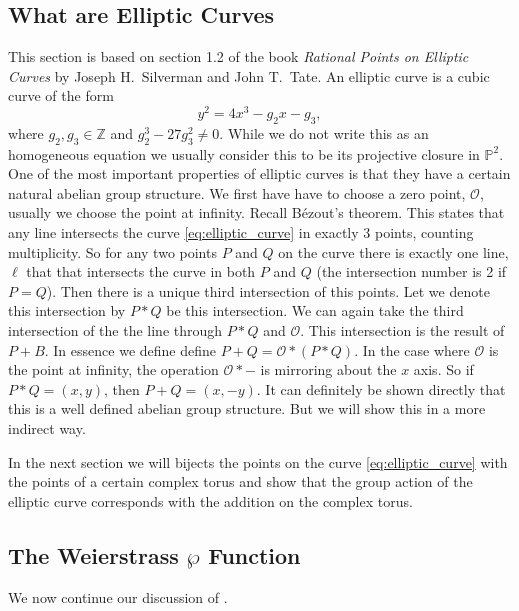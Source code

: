 \documentclass[a4paper]{article}
\theoremstyle{theoremdd}
\theoremstyle{definitiondd}
\theoremstyle{remarkdd}
\newcommand{\Z}{\mathbb{Z}}
\begin{document}
\subsection{What are Elliptic Curves}
This section is based on section 1.2 of the book \emph{Rational Points on Elliptic Curves} by Joseph H.\ Silverman and John T.\ Tate\cite{silvermanRationalPointsElliptic2015}.
An elliptic curve is a cubic curve of the form \begin{equation}\label{eq:elliptic_curve}
y^2 = 4x^3 - g_2x - g_3
,\end{equation}
where $g_2, g_3 \in \Z$ and $g_2^3 - 27 g_3^2 \ne 0$. 
While we do not write this as an homogeneous equation we usually consider this to be its projective closure in $\mathbb{P}^2$. 
One of the most important properties of elliptic curves is that they have a certain natural abelian group structure. 
We first have have to choose a zero point, $\mathcal{O} $, usually we choose the point at infinity.
Recall B\'ezout's theorem. 
This states that any line intersects the curve \eqref{eq:elliptic_curve} in exactly 3 points, counting multiplicity.  
So for any two points $P$ and $Q$ on the curve there is exactly one line, $\ell$ that that intersects the curve in both $P$ and $Q$ (the intersection number is 2  if $P = Q$). 
Then there is a unique third intersection of this points. Let we denote this intersection by $P*Q$ be this intersection.
We can again take the third intersection of the the line through $P*Q$ and $\mathcal{O}$. This intersection is the result of $P + B$.
In essence we define define $P + Q =\mathcal{O} *(P*Q)$.
In the case where $\mathcal{O} $ is the point at infinity, the operation $\mathcal{O} * -$ is mirroring about the $x$ axis. So if $P * Q = (x,y)$, then $P + Q = (x, -y)$.
It can definitely be shown directly that this is a well defined abelian group structure. But we will show this in a more indirect way. 

In the next section we will bijects the points on the curve \eqref{eq:elliptic_curve} with the points of a certain complex torus and show that the group action of the elliptic curve corresponds with the addition on the complex torus.

\subsection{The Weierstrass $\wp$ Function} \label{sec:The_Weierstrass_wp_Function}
We now continue our discussion of \cite{diamondFirstCourseModular2005a}.
\end{document}
